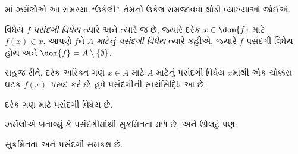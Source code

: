 \citeyear{Zermelo1904}માં ઝર્મેલોએ આ
સમસ્યા ``ઉકેલી''. તેમનો ઉકેલ સમજાવવા
થોડી વ્યાખ્યાઓ જોઈએ.

\begin{defn}
વિધેય $f$ \emph{પસંદગી વિધેય} ત્યારે અને
ત્યારે જ છે, જ્યારે દરેક $x \in \dom{f}$
માટે $f(x) \in x$. આપણે $f$ને
\emph{$A$ માટેનું પસંદગી વિધેય} ત્યારે કહીએ,
જ્યારે $f$ પસંદગી વિધેય હોય અને
$\dom{f} = A \setminus \{\emptyset\}$.
\end{defn}

સહજ રીતે, દરેક અરિક્ત ગણ $x \in A$ માટે
$A$ માટેનું પસંદગી વિધેય $x$માંથી એક ચોક્કસ ઘટક
$f(x)$ \emph{પસંદ કરે છે}. હવે પસંદગીની
સ્વયંસિદ્ધિ આ છે:

\begin{axiom}[પસંદગી]
	દરેક ગણ માટે પસંદગી વિધેય છે.
\end{axiom}

ઝર્મેલોએ બતાવ્યું કે પસંદગીમાંથી સુક્રમિતતા
મળે છે, અને ઊલટું પણ:

\begin{thm}[$\ZF$માં]
સુક્રમિતતા અને પસંદગી સમકક્ષ છે.
\end{thm}

